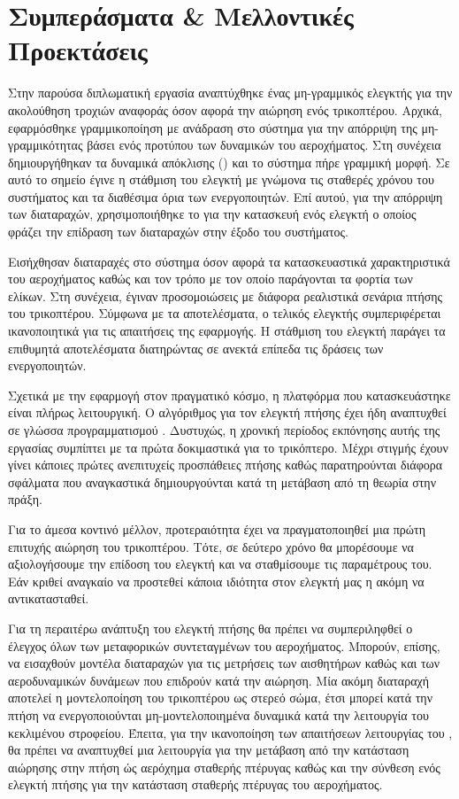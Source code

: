 \chapter{Συμπεράσματα \& Μελλοντικές Προεκτάσεις}
Στην παρούσα διπλωματική εργασία αναπτύχθηκε ένας μη-γραμμικός ελεγκτής για την 
ακολούθηση τροχιών αναφοράς όσον αφορά την αιώρηση ενός τρικοπτέρου. Αρχικά, 
εφαρμόσθηκε γραμμικοποίηση με ανάδραση στο σύστημα για την απόρριψη της 
μη-γραμμικότητας βάσει ενός προτύπου των δυναμικών του αεροχήματος. Στη συνέχεια 
δημιουργήθηκαν τα δυναμικά απόκλισης () και το σύστημα πήρε 
γραμμική μορφή. Σε αυτό το σημείο έγινε η στάθμιση του ελεγκτή με γνώμονα τις 
σταθερές χρόνου του συστήματος και τα διαθέσιμα όρια των ενεργοποιητών. Επί 
αυτού, για την απόρριψη των διαταραχών, χρησιμοποιήθηκε το  για την κατασκευή ενός ελεγκτή ο οποίος φράζει την επίδραση των 
διαταραχών στην έξοδο του συστήματος.  

Εισήχθησαν διαταραχές στο σύστημα όσον αφορά τα κατασκευαστικά χαρακτηριστικά 
του αεροχήματος καθώς και τον τρόπο με τον οποίο παράγονται τα φορτία των ελίκων.
Στη συνέχεια,  έγιναν προσομοιώσεις με διάφορα ρεαλιστικά σενάρια πτήσης του 
τρικοπτέρου. Σύμφωνα με τα αποτελέσματα, ο τελικός ελεγκτής συμπεριφέρεται 
ικανοποιητικά για τις απαιτήσεις της εφαρμογής. Η στάθμιση του ελεγκτή παράγει
τα επιθυμητά αποτελέσματα διατηρώντας σε ανεκτά επίπεδα τις δράσεις των 
ενεργοποιητών.

Σχετικά με την εφαρμογή στον πραγματικό κόσμο, η πλατφόρμα που κατασκευάστηκε 
είναι πλήρως λειτουργική. Ο αλγόριθμος για τον ελεγκτή πτήσης  
έχει ήδη αναπτυχθεί σε γλώσσα προγραμματισμού . Δυστυχώς, η χρονική 
περίοδος εκπόνησης αυτής της εργασίας συμπίπτει με τα πρώτα δοκιμαστικά για το 
τρικόπτερο. Μέχρι στιγμής έχουν γίνει κάποιες πρώτες ανεπιτυχείς προσπάθειες 
πτήσης καθώς παρατηρούνται διάφορα σφάλματα που αναγκαστικά δημιουργούνται κατά 
τη μετάβαση από τη θεωρία στην πράξη.

Για το άμεσα κοντινό μέλλον, προτεραιότητα έχει να πραγματοποιηθεί μια πρώτη 
επιτυχής αιώρηση του τρικοπτέρου. Τότε, σε δεύτερο χρόνο θα μπορέσουμε να 
αξιολογήσουμε την επίδοση του ελεγκτή και να σταθμίσουμε τις παραμέτρους του. 
Εάν κριθεί αναγκαίο να προστεθεί κάποια ιδιότητα στον ελεγκτή μας η ακόμη να 
αντικατασταθεί.

Για τη περαιτέρω ανάπτυξη του ελεγκτή πτήσης θα πρέπει να συμπεριληφθεί ο 
έλεγχος όλων των μεταφορικών συντεταγμένων του αεροχήματος. Μπορούν, επίσης, να 
εισαχθούν μοντέλα διαταραχών για τις μετρήσεις των αισθητήρων καθώς και 
των αεροδυναμικών δυνάμεων που επιδρούν κατά την αιώρηση. Μία ακόμη διαταραχή 
αποτελεί η μοντελοποίηση του τρικοπτέρου ως στερεό σώμα, έτσι μπορεί κατά την 
πτήση να ενεργοποιούνται μη-μοντελοποιημένα δυναμικά κατά την λειτουργία του 
κεκλιμένου στροφείου. Έπειτα, για την ικανοποίηση των απαιτήσεων λειτουργίας του
, θα πρέπει να αναπτυχθεί μια λειτουργία για την μετάβαση από την 
κατάσταση αιώρησης στην πτήση ώς αερόχημα σταθερής πτέρυγας καθώς και την 
σύνθεση ενός ελεγκτή πτήσης για την κατάσταση σταθερής πτέρυγας του αεροχήματος.
